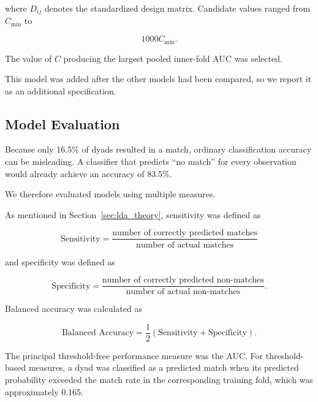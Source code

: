 \documentclass[11pt,letterpaper,reqno]{amsart}
\numberwithin{equation}{subsection}
\theoremstyle{definition}
\numberwithin{thm}{subsection}
\begin{document}
where $D_{ij}$ denotes the standardized design matrix. Candidate values ranged from $C_{\min}$ to

\begin{equation}
1000C_{\min}.
\end{equation}

The value of $C$ producing the largest pooled inner-fold AUC was selected.

This model was added after the other models had been compared, so we report it as an additional specification.


\subsection{Model Evaluation}

Because only 16.5\% of dyads resulted in a match, ordinary classification accuracy can be misleading. A classifier that predicts ``no match'' for every observation would already achieve an accuracy of 83.5\%.

We therefore evaluated models using multiple measures.

As mentioned in Section~\ref{sec:lda_theory},
sensitivity was defined as

\begin{equation}
\text{Sensitivity}
=
\frac{
\text{number of correctly predicted matches}
}{
\text{number of actual matches}
}
\end{equation}

and specificity was defined as

\begin{equation}
\text{Specificity}
=
\frac{
\text{number of correctly predicted non-matches}
}{
\text{number of actual non-matches}
}.
\end{equation}

Balanced accuracy was calculated as

\begin{equation}
\text{Balanced Accuracy}
=
\frac{1}{2}
\left(
\text{Sensitivity}
+
\text{Specificity}
\right).
\end{equation}

The principal threshold-free performance measure was the AUC. For threshold-based measures, a dyad was classified as a predicted match when its predicted probability exceeded the match rate in the corresponding training fold, which was approximately 0.165:
\end{document}
